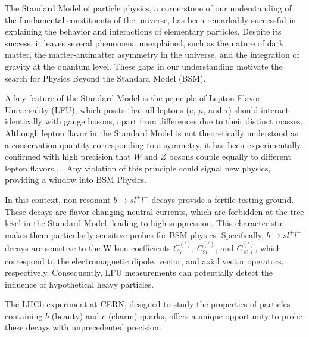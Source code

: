The Standard Model of particle physics, a cornerstone of our 
understanding of the fundamental constituents of the universe, 
has been remarkably successful in explaining the behavior 
and interactions of elementary particles. Despite its success, 
it leaves several phenomena unexplained, such as the 
nature of dark matter, the matter-antimatter asymmetry in the 
universe, and the integration of gravity at the quantum level. 
These gaps in our understanding motivate the search for Physics 
Beyond the Standard Model (BSM).

A key feature of the Standard Model is the principle of Lepton 
Flavor Universality (LFU), which posits that all leptons ($e$, 
$\mu$, and $\tau$) should interact identically with gauge bosons, 
apart from differences due to their distinct masses. Although 
lepton flavor in the Standard Model is not theoretically understood 
as a conservation quantity corresponding to a symmetry, it has 
been experimentally confirmed with high precision that $W$ and $Z$ 
bosons couple equally to different lepton flavors \cite{LU_CDF}, 
\cite{LU_ATLAS}. Any violation of this principle could signal new 
physics, providing a window into BSM Physics.

In this context, non-resonant $b\to sl^+l^-$ decays provide a fertile 
testing ground. These decays are flavor-changing neutral currents, 
which are forbidden at the tree level in the Standard Model, leading to high 
suppression. This characteristic makes them particularly sensitive 
probes for BSM physics. Specifically, $b\to sl^+l^-$ decays are 
sensitive to the Wilson coefficients $C_7^{\scriptscriptstyle (')}$, 
$C_{9l}^{\scriptscriptstyle (')}$, and $C_{10,l}^{\scriptscriptstyle (')}$, 
which correspond to the electromagnetic dipole, vector, and axial 
vector operators, respectively. %
Consequently, LFU measurements can potentially detect the influence 
of hypothetical heavy particles.

The LHCb experiment at CERN, designed to study the 
properties of particles containing $b$ (beauty) and $c$ (charm) quarks, offers 
a unique opportunity to probe these decays with unprecedented precision.
